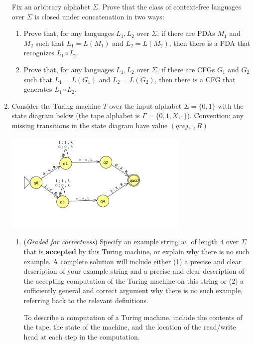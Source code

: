 \begin{enumerate}
Fix an arbitrary alphabet $\Sigma$. 
Prove that the class of context-free languages over $\Sigma$ is closed under concatenation in two ways:
\begin{enumerate}
    \item Prove that, for any languages $L_1, L_2$ over $\Sigma$, if there 
    are PDAs $M_1$ and $M_2$ such that $L_1 = L(M_1)$ and $L_2 = L(M_2)$, then there is 
    a PDA that recognizes $L_1 \circ L_2$.
    \item Prove that, for any languages $L_1, L_2$ over $\Sigma$, if there 
    are CFGs $G_1$ and $G_2$ such that $L_1 = L(G_1)$ and $L_2 = L(G_2)$, then there is 
    a CFG that generates $L_1 \circ L_2$.
\end{enumerate}


\item Consider the Turing machine $T$ over the input alphabet $\Sigma = \{0,1\}$ with  the state
    diagram below (the tape alphabet is $\Gamma = \{ 0,1,X,\square\}$).  
    Convention:  any missing transitions in the state diagram have value $(qrej,\square,R)$
    \begin{center}
    \includegraphics[width=3.5in]{../../resources/machines/hw4TM.png}
    \end{center}
    \begin{enumerate}

        \item ({\it Graded for correctness}) Specify an example string $w_1$ of length $4$ over 
        $\Sigma$ that is {\bf accepted} by this Turing machine, or explain why there is no such 
        example. A complete solution will include either (1) a precise and clear 
        description of your example  string and a precise and clear description of the accepting computation
        of the Turing machine on this string or (2) a sufficiently
        general and correct argument why there is no such example, referring back to the relevant definitions.
        
        To describe a computation of a Turing machine, include the contents of the 
        tape, the state of the machine, and the location of the read/write head at each step in the computation.
        

\end{enumerate}
\end{enumerate}
